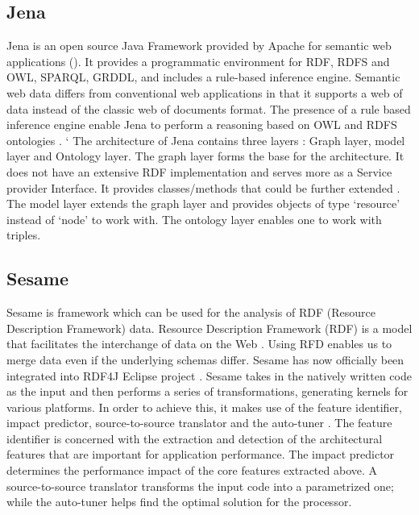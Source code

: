 {     \pv

\subsection{Jena }

     Jena is an open source Java Framework provided by Apache for
     semantic web applications (\cite{www-w3-jena}). It provides a
     programmatic environment for RDF, RDFS and OWL, SPARQL, GRDDL,
     and includes a rule-based inference engine. Semantic web data
     differs from conventional web applications in that it supports a
     web of data instead of the classic web of documents format. The
     presence of a rule based inference engine enable Jena to perform
     a reasoning based on OWL and RDFS ontologies
     \cite{www-trimc-nlp-blogspot}. ` The architecture of Jena
     contains three layers : Graph layer, model layer and Ontology
     layer. The graph layer forms the base for the architecture. It
     does not have an extensive RDF implementation and serves more as
     a Service provider Interface. It provides classes/methods that
     could be further extended \cite{www-trimc-nlp-blogspot}.
     The model layer extends the graph
     layer and provides objects of type ‘resource’ instead of ‘node’
     to work with.  The ontology layer enables one to work with
     triples.

     \pv

\subsection{Sesame}

     Sesame is framework which can be used for the analysis of RDF
     (Resource Description Framework) data.  Resource Description
     Framework (RDF) is a model that facilitates the
     interchange of data on the Web \cite{www-RDF}.
     Using RFD enables us to merge
     data even if the underlying schemas differ.  Sesame has now 
     officially been integrated into RDF4J Eclipse project \cite{www-sesame}.  
     Sesame takes in the natively written code as the input and then 
     performs a series of transformations, generating kernels for
     various platforms.  In order to achieve this, it makes use of the
     feature identifier, impact predictor, source-to-source translator 
     and the auto-tuner \cite{sesame-paper-2013}.  The
     feature identifier is concerned with the extraction and detection
     of the architectural features that are important for application
     performance.  The impact predictor determines the performance
     impact of the core features extracted above.  A source-to-source
     translator transforms the input code into a parametrized one;
     while the auto-tuner helps find the optimal solution for the
     processor.

}
